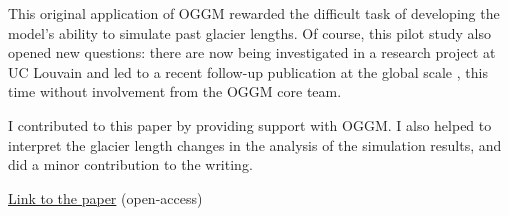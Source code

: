 This original application of OGGM rewarded the difficult task
of developing the model’s ability to simulate past glacier lengths. Of course,
this pilot study also opened new questions: there are now being investigated in a research project at UC Louvain
and led to a recent follow-up publication at the global scale \citep{Parkes2020}, this time without
involvement from the OGGM core team.

I contributed to this paper by providing support with OGGM. I also helped to interpret the glacier
length changes in the analysis of the simulation results, and did a minor contribution to the writing.

\href{https://doi.org/10.5194/cp-14-1119-2018}{Link to the paper} (open-access)


\iflong  \else \fi 

